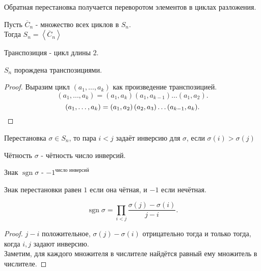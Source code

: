 \documentclass[11pt, oneside]{article}   	%
\DeclareMathOperator{\sgn}{sgn}
\begin{document}
    \begin{theorem}
        Обратная перестановка получается переворотом элементов в циклах разложения.
    \end{theorem}
    \begin{theorem}
        Пусть $\overline{C}_n$ - множество всех циклов в $S_n$.\\
        Тогда $S_n = \left<\overline{C}_n\right>$
    \end{theorem}
    \begin{definition}
        Транспозиция - цикл длины $2$.
    \end{definition}
    \begin{theorem}
        $S_n$  порождена транспозициями.\\
        \begin{proof}
            Выразим цикл $\left( a_1, \ldots, a_k \right) $ как произведение транспозицией.\\
            \[ (a_1, \ldots, a_k) = (a_1, a_k)(a_1, a_{k-1})\ldots\left( a_1, a_2 \right)  .\]
            \[ \left( a_1, \ldots, a_k \right) = \left( a_1, a_2 \right) \left( a_2, a_3 \right) \ldots (a_{k-1}, a_k) .\qedhere\] 
        \end{proof}
    \end{theorem}
    \begin{definition}
        Перестановка $\sigma\in S_n$, то пара $i<j$ задаёт инверсию для $\sigma$, если $\sigma(i)>\sigma(j)$
    \end{definition}
    \begin{definition}
        Чётность $\sigma$ - чётность число инверсий.
    \end{definition}
    \begin{definition}
        Знак $\sgn \sigma$ - $-1^{\text{число инверсий}}$
    \end{definition}
    \begin{dlemma}
        Знак перестановки равен $1$ если она чётная, и $-1$ если нечётная.
    \end{dlemma}
    \begin{dlemma}
        \[ \sgn \sigma = \prod\limits_{i<j} \frac{\sigma(j)-\sigma(i)}{j-i}  .\]
        \begin{proof}
            $j-i$ положительное, $\sigma(j)-\sigma(i)$ отрицательно тогда и только тогда, когда $i,j$ задают инверсию.\\
            Заметим, для каждого множителя в числителе найдётся равный ему множитель в числителе.
        \end{proof}
    \end{dlemma}
\end{document}

